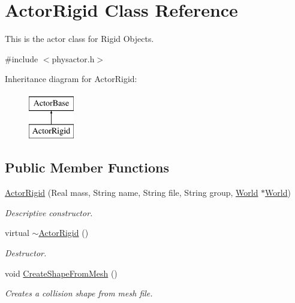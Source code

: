 \hypertarget{classActorRigid}{
\section{ActorRigid Class Reference}
\label{d5/d10/classActorRigid}
}


This is the actor class for Rigid Objects.  




{\ttfamily \#include $<$physactor.h$>$}

Inheritance diagram for ActorRigid:\begin{figure}[H]
\begin{center}
\leavevmode
\includegraphics[height=2cm]{d5/d10/classActorRigid}
\end{center}
\end{figure}
\subsection*{Public Member Functions}
\begin{DoxyCompactItemize}
\item 
\hyperlink{classActorRigid_a8a71c343f3872cce605212c0c22e7e14}{ActorRigid} (Real mass, String name, String file, String group, \hyperlink{classphys_1_1World}{World} $\ast$\hyperlink{classphys_1_1World}{World})
\begin{DoxyCompactList}\small\item\em Descriptive constructor. \item\end{DoxyCompactList}\item 
virtual \hyperlink{classActorRigid_a36b9eb18fc9e83769a48eb1c34312889}{$\sim$ActorRigid} ()
\begin{DoxyCompactList}\small\item\em Destructor. \item\end{DoxyCompactList}\item 
void \hyperlink{classActorRigid_a1a1b7ca97c69bb5420a76116c388b3d1}{CreateShapeFromMesh} ()
\begin{DoxyCompactList}\small\item\em Creates a collision shape from mesh file. \item\end{DoxyCompactList}\end{DoxyCompactItemize}
